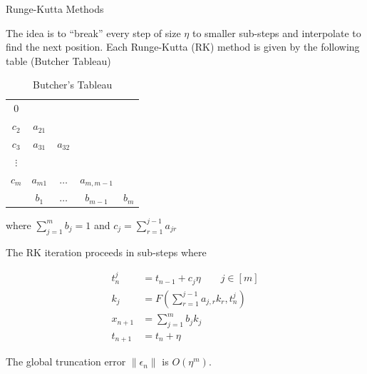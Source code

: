 \documentclass{beamer}
\begin{document}
\begin{frame}[allowframebreaks]{Runge-Kutta Methods}

The idea is to ``break'' every step of size $\eta$ to smaller sub-steps and interpolate to find the next position. Each Runge-Kutta (RK) method is given by the following table (Butcher Tableau)

\begin{table}[]
    \centering
    \begin{tabular}{c|cccc}
        0 &  \\
        $c_2$ & $a_{21}$\\
        $c_3$ & $a_{31}$ & $a_{32}$ \\
        $\vdots$ & \\
        $c_m$ & $a_{m1}$ & $\dots$ & $a_{m,m-1}$ \\ \hline
         & $b_1$ & $\dots$ & $b_{m-1}$ & $b_m$ \\
    \end{tabular}
    \caption{Butcher's Tableau}
    \label{tab:my_label}
\end{table}

where $\sum_{j = 1}^m b_j = 1$ and $c_j = \sum_{r = 1}^{j-1} a_{jr}$

\framebreak

The RK iteration proceeds in sub-steps where

\begin{align*}
    t_{n}^j & = t_{n-1} + c_j \eta \qquad j \in [m] \\
    k_j & = F \left ( \sum_{r = 1}^{j - 1} a_{j, r} k_r , t_n^j \right ) \\
    x_{n + 1} & = \sum_{j = 1}^m b_j k_j \\
    t_{n + 1} & = t_n + \eta
\end{align*}
    
The global truncation error $\| \epsilon_n \|$ is $O(\eta^m)$.      
    
\end{frame}
\end{document}
